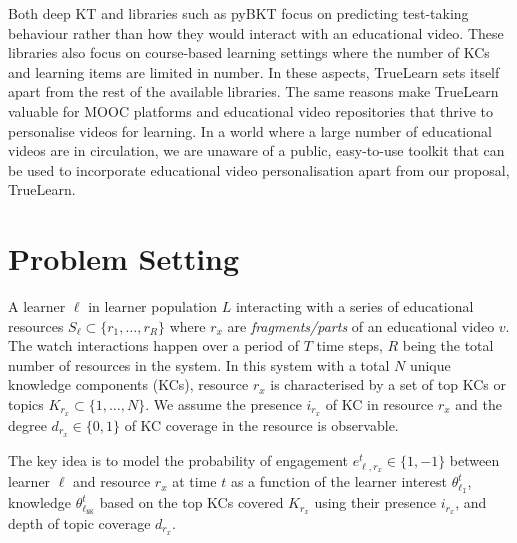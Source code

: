 \documentclass[letterpaper]{article} %
\begin{document}
Both deep KT and libraries such as pyBKT focus on predicting test-taking behaviour \cite{psych5030050} rather than how they would interact with an educational video. These libraries also focus on course-based learning settings where the number of KCs and learning items are limited in number. In these aspects, TrueLearn sets itself apart from the rest of the available libraries. The same reasons make TrueLearn valuable for MOOC platforms and educational video repositories that thrive to personalise videos for learning. In a world where a large number of educational videos are in circulation, we are unaware of a public, easy-to-use toolkit that can be used to incorporate educational video personalisation apart from our proposal, TrueLearn.



\section{Problem Setting}

A learner $\ell$ in learner population $L$ interacting with a series of educational resources $S_\ell \subset \{r_1, \ldots, r_{R}\}$ where $r_x$ are \emph{fragments/parts} of an educational video $v$. The watch interactions happen over a period of $T$ time steps, $R$ being the total number of resources in the system.
In this system with a total $N$ unique knowledge components (KCs), resource $r_x$ is characterised by a set of top KCs or topics $K_{r_x} \subset \{1, \ldots, N \}$. We assume the presence $i_{r_x}$ of KC in resource $r_x$ and the degree $d_{r_x}\in \{ 0,1\}$ of KC coverage in the resource is observable.

The key idea is to model the probability of engagement $e_{\ell, r_x}^{t} \in \{ 1, -1\}$ between learner $\ell$ and resource $r_x$ at time $t$ as a function of the learner interest $\theta^t_{\ell_{\texttt{I}}}$, knowledge $\theta^t_{\ell_{\texttt{NK}}}$ based on the top KCs covered $K_{r_x}$ using their presence $i_{r_x}$, and depth of topic coverage $d_{r_x}$.
\end{document}
